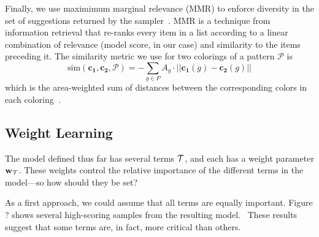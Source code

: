 Finally, we use maximimum marginal relevance (MMR) to enforce diversity in the set of suggestions returned by the sampler~\cite{MMR}. MMR is a technique from information retrieval that re-ranks every item in a list according to a linear combination of relevance (model score, in our case) and similarity to the items preceding it. The similarity metric we use for two colorings of a pattern $\mathcal{P}$ is
\begin{equation*}
\text{sim}(\mathbf{c_1}, \mathbf{c_2}, \mathcal{P}) = - \sum_{g \in P} {A_g \cdot ||\mathbf{c_1}(g) - \mathbf{c_2}(g)||}
\end{equation*}
which is the area-weighted sum of \lab distances between the corresponding colors in each coloring~.

\subsection{Weight Learning}
\label{sec:weights}


The model defined thus far has several terms $\mathcal{T}$, and each has a weight parameter $\mathbf{w}_{\mathcal{T}}$. These weights control the relative importance of the different terms in the model---so how should they be set?

As a first approach, we could assume that all terms are equally important. Figure ? shows several high-scoring samples from the resulting model.~ These results suggest that some terms are, in fact, more critical than others.

